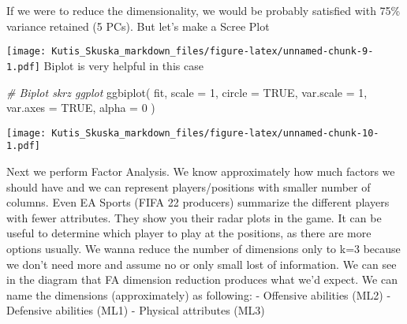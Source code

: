 \documentclass[
]{article}
\newenvironment{Shaded}{\begin{snugshade}}{\end{snugshade}}
\newcommand{\AttributeTok}[1]{\textcolor[rgb]{0.77,0.63,0.00}{#1}}
\newcommand{\CommentTok}[1]{\textcolor[rgb]{0.56,0.35,0.01}{\textit{#1}}}
\newcommand{\ConstantTok}[1]{\textcolor[rgb]{0.00,0.00,0.00}{#1}}
\newcommand{\DecValTok}[1]{\textcolor[rgb]{0.00,0.00,0.81}{#1}}
\newcommand{\FunctionTok}[1]{\textcolor[rgb]{0.00,0.00,0.00}{#1}}
\newcommand{\NormalTok}[1]{#1}
\newcommand{\OtherTok}[1]{\textcolor[rgb]{0.56,0.35,0.01}{#1}}
\newcommand{\SpecialCharTok}[1]{\textcolor[rgb]{0.00,0.00,0.00}{#1}}
\newcommand{\StringTok}[1]{\textcolor[rgb]{0.31,0.60,0.02}{#1}}
\begin{document}
If we were to reduce the dimensionality, we would be probably satisfied
with 75\% variance retained (5 PCs). But let's make a Scree Plot

\begin{Shaded}
\end{Shaded}

\texttt{[image: Kutis\_Skuska\_markdown\_files/figure-latex/unnamed-chunk-9-1.pdf]}
Biplot is very helpful in this case

\begin{Shaded}
\begin{Highlighting}[]
\CommentTok{\# Biplot skrz ggplot}
\FunctionTok{ggbiplot}\NormalTok{(}
\NormalTok{    fit,}
    \AttributeTok{scale =} \DecValTok{1}\NormalTok{,}
    \AttributeTok{circle =} \ConstantTok{TRUE}\NormalTok{,}
    \AttributeTok{var.scale =} \DecValTok{1}\NormalTok{,}
    \AttributeTok{var.axes =} \ConstantTok{TRUE}\NormalTok{,}
    \AttributeTok{alpha =} \DecValTok{0}
\NormalTok{)}
\end{Highlighting}
\end{Shaded}

\texttt{[image: Kutis\_Skuska\_markdown\_files/figure-latex/unnamed-chunk-10-1.pdf]}

Next we perform Factor Analysis. We know approximately how much factors
we should have and we can represent players/positions with smaller
number of columns. Even EA Sports (FIFA 22 producers) summarize the
different players with fewer attributes. They show you their radar plots
in the game. It can be useful to determine which player to play at the
positions, as there are more options usually. We wanna reduce the number
of dimensions only to k=3 because we don't need more and assume no or
only small lost of information. We can see in the diagram that FA
dimension reduction produces what we'd expect. We can name the
dimensions (approximately) as following: - Offensive abilities (ML2) -
Defensive abilities (ML1) - Physical attributes (ML3)
\end{document}
